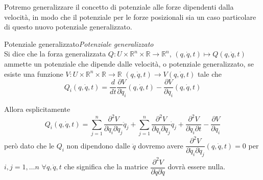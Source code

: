 \documentclass[11pt,a4paper,twoside]{book}
\newenvironment{definizione}[1][\empty]{\begin{Definizione}{
\ifx\empty#1\relax\else\mdseries\itshape#1\\\fi
}{}}{\end{Definizione}}
\theoremstyle{esss}
\theoremstyle{dotless}
\numberwithin{equation}{section} %
\begin{document}
Potremo generalizzare il concetto di potenziale alle forze dipendenti dalla velocità, in modo che il potenziale per le forze posizionali sia un caso particolare di questo nuovo potenziale generalizzato.

\begin{definizione}[Potenziale generalizzato]
Si dice che la forza generalizzata $Q:U\times\mathbb{R}^n\times\mathbb{R}\rightarrow\mathbb{R}^n$, $(q,\dot{q},t)\mapsto Q(q,\dot{q},t)$ ammette un potenziale che dipende dalle velocità, o potenziale generalizzato, se esiste una funzione $V:U\times\mathbb{R}^n\times\mathbb{R}\rightarrow\mathbb{R}$ $(q,\dot{q},t)\rightarrow V(q,\dot{q},t)$ tale che
\[
Q_i(q,\dot{q},t)=\dfrac{d}{dt}\dfrac{\partial V}{\partial \dot{q}_i}(q,\dot{q},t) - \dfrac{\partial V}{\partial q_i}(q,\dot{q},t)
\]
\end{definizione}

Allora esplicitamente
\[
Q_i(q,\dot{q},t)=\sum_{j=1}^n \dfrac{\partial^2 V}{\partial \dot{q}_i\partial\dot{q}_j}\ddot{q}_j +\sum_{j=1}^n \dfrac{\partial^2 V}{\partial \dot{q}_i \partial q_j}\dot{q}_j + \dfrac{\partial^2 V}{\partial \dot{q}_i \partial t} - \dfrac{\partial V}{\partial q_i}
\]
però dato che le $Q_i$ non dipendono dalle $\ddot{q}$ dovremo avere
$ \dfrac{\partial^2 V}{\partial \dot{q}_i \partial \dot{q}_j}(q,\dot{q},t) =0 $ per $ i,j=1,\dots n$ $\forall q,\dot{q},t$
che significa che la matrice $\dfrac{\partial^2 V}{\partial \dot{q}\partial \dot{q}}$ dovrà essere nulla. 
\end{document}

